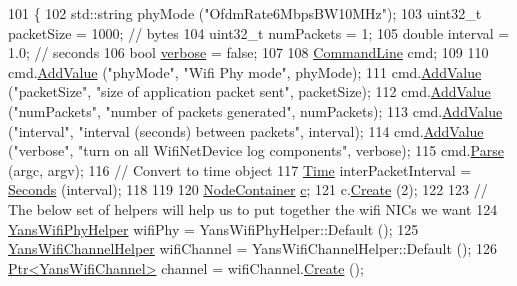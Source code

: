 \begin{DoxyCode}
101 \{
102   std::string phyMode (\textcolor{stringliteral}{"OfdmRate6MbpsBW10MHz"});
103   uint32\_t packetSize = 1000; \textcolor{comment}{// bytes}
104   uint32\_t numPackets = 1;
105   \textcolor{keywordtype}{double} interval = 1.0; \textcolor{comment}{// seconds}
106   \textcolor{keywordtype}{bool} \hyperlink{openflow-switch_8cc_ab3f078684998b83967d507d0f453f454}{verbose} = \textcolor{keyword}{false};
107 
108   \hyperlink{classns3_1_1CommandLine}{CommandLine} cmd;
109 
110   cmd.\hyperlink{classns3_1_1CommandLine_addcfb546c7ad4c8bd0965654d55beb8e}{AddValue} (\textcolor{stringliteral}{"phyMode"}, \textcolor{stringliteral}{"Wifi Phy mode"}, phyMode);
111   cmd.\hyperlink{classns3_1_1CommandLine_addcfb546c7ad4c8bd0965654d55beb8e}{AddValue} (\textcolor{stringliteral}{"packetSize"}, \textcolor{stringliteral}{"size of application packet sent"}, packetSize);
112   cmd.\hyperlink{classns3_1_1CommandLine_addcfb546c7ad4c8bd0965654d55beb8e}{AddValue} (\textcolor{stringliteral}{"numPackets"}, \textcolor{stringliteral}{"number of packets generated"}, numPackets);
113   cmd.\hyperlink{classns3_1_1CommandLine_addcfb546c7ad4c8bd0965654d55beb8e}{AddValue} (\textcolor{stringliteral}{"interval"}, \textcolor{stringliteral}{"interval (seconds) between packets"}, interval);
114   cmd.\hyperlink{classns3_1_1CommandLine_addcfb546c7ad4c8bd0965654d55beb8e}{AddValue} (\textcolor{stringliteral}{"verbose"}, \textcolor{stringliteral}{"turn on all WifiNetDevice log components"}, verbose);
115   cmd.\hyperlink{classns3_1_1CommandLine_a5c10b85b3207e5ecb48d907966923156}{Parse} (argc, argv);
116   \textcolor{comment}{// Convert to time object}
117   \hyperlink{classns3_1_1Time}{Time} interPacketInterval = \hyperlink{group__timecivil_ga33c34b816f8ff6628e33d5c8e9713b9e}{Seconds} (interval);
118 
119 
120   \hyperlink{classns3_1_1NodeContainer}{NodeContainer} \hyperlink{lte_2model_2fading-traces_2fading__trace__generator_8m_ae0323a9039add2978bf5b49550572c7c}{c};
121   c.\hyperlink{classns3_1_1NodeContainer_a787f059e2813e8b951cc6914d11dfe69}{Create} (2);
122 
123   \textcolor{comment}{// The below set of helpers will help us to put together the wifi NICs we want}
124   \hyperlink{classns3_1_1YansWifiPhyHelper}{YansWifiPhyHelper} wifiPhy =  YansWifiPhyHelper::Default ();
125   \hyperlink{classns3_1_1YansWifiChannelHelper}{YansWifiChannelHelper} wifiChannel = YansWifiChannelHelper::Default ();
126   \hyperlink{classns3_1_1Ptr}{Ptr<YansWifiChannel>} channel = wifiChannel.\hyperlink{classns3_1_1YansWifiChannelHelper_a0532e292ab9452f3cf630c848708e563}{Create} ();

\end{DoxyCode}
